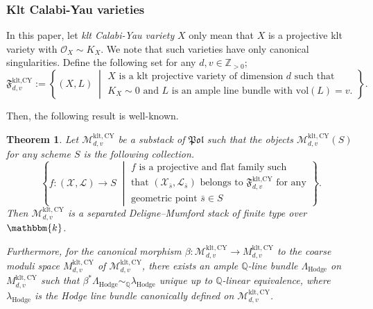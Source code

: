 \documentclass[12pt,twoside]{amsart}
\newtheorem{thm}{Theorem}[section]
\theoremstyle{definition}
\begin{document}
\subsubsection{Klt Calabi-Yau varieties}

In this paper, let {\it klt Calabi-Yau variety} $X$ only mean that $X$ is a projective klt variety with $\mathcal{O}_X\sim K_X$.
We note that such varieties have only canonical singularities.
Define the following set for any $d,v\in\mathbb{Z}_{>0}$;
$$\mathfrak{F}^{\text{klt,CY}}_{d,v}:=\left\{
 (X,L)
\;\middle|
\begin{array}{l}
\text{$X$ is a klt projective variety of dimension $d$ such that}\\
\text{$K_X\sim 0$ and $L$ is an ample line bundle with $\mathrm{vol}(L)=v$.}
\end{array}\right\}.$$



Then, the following result is well-known. 

\begin{thm}\label{thm--klt--CY--moduli}
    Let $\mathcal{M}^{\mathrm{klt,CY}}_{d,v}$ be a substack of $\mathfrak{Pol}$ such that the objects $\mathcal{M}^{\mathrm{klt,CY}}_{d,v}(S)$ for any scheme $S$ is the following collection.
    \[
\left\{
 f\colon(\mathcal{X},\mathcal{L})\to S
\;\middle|
\begin{array}{l}
\text{$f$ is a projective and flat family such}\\
\text{that $(\mathcal{X}_{\bar{s}},\mathcal{L}_{\bar{s}})$ belongs to $\mathfrak{F}^{\text{klt,CY}}_{d,v}$ for any}\\
\text{geometric point $\bar{s}\in S$}
\end{array}\right\}.
    \]
    Then $\mathcal{M}^{\mathrm{klt,CY}}_{d,v}$ is a separated Deligne--Mumford stack of finite type over $\mathbbm{k}$.  

    Furthermore, for the canonical morphism $\beta\colon \mathcal{M}^{\mathrm{klt,CY}}_{d,v}\to M^{\mathrm{klt,CY}}_{d,v}$ to the coarse moduli space $M^{\mathrm{klt,CY}}_{d,v}$ of $\mathcal{M}^{\mathrm{klt,CY}}_{d,v}$, there exists an ample $\mathbb{Q}$-line bundle $\Lambda_{\mathrm{Hodge}}$ on $M^{\mathrm{klt,CY}}_{d,v}$ such that $\beta^*\Lambda_{\mathrm{Hodge}}\sim_{\mathbb{Q}}\lambda_{\mathrm{Hodge}}$ unique up to $\mathbb{Q}$-linear equivalence, where $\lambda_{\mathrm{Hodge}}$ is the Hodge line bundle canonically defined on $\mathcal{M}^{\mathrm{klt,CY}}_{d,v}$. 
\end{thm}
\end{document}
